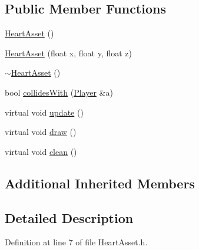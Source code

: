 \subsection*{Public Member Functions}
\begin{DoxyCompactItemize}
\item 
\hyperlink{classHeartAsset_a68370016b5184e3e541070eac1ebaed4}{Heart\-Asset} ()
\item 
\hyperlink{classHeartAsset_ac9be59ddbf1799b9523b94b224c2ebdd}{Heart\-Asset} (float x, float y, float z)
\item 
\hyperlink{classHeartAsset_a188438e39a1e5242ab9da9b3574cf1e5}{$\sim$\-Heart\-Asset} ()
\item 
bool \hyperlink{classHeartAsset_aeeea2e4cebcb2e238544607ab8fcb7b7}{collides\-With} (\hyperlink{classPlayer}{Player} \&a)
\item 
virtual void \hyperlink{classHeartAsset_aa4fb245ae438223980f781cb070e0050}{update} ()
\item 
virtual void \hyperlink{classHeartAsset_a12139c94af340272cfcb726a5665bede}{draw} ()
\item 
virtual void \hyperlink{classHeartAsset_a33b4a41bfc915fc95d23d9b1fbf68dad}{clean} ()
\end{DoxyCompactItemize}
\subsection*{Additional Inherited Members}


\subsection{Detailed Description}


Definition at line 7 of file Heart\-Asset.\-h.




